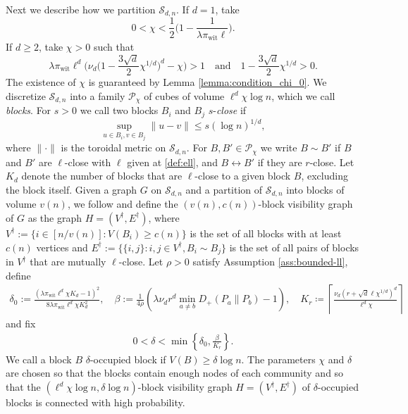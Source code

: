 \documentclass[11pt, a4paper]{amsart}
\newcommand{\1}{\mathbf{1}}
\newcommand{\visible}{\leftrightarrow{}}
\theoremstyle{definition}
\theoremstyle{remark}
\theoremstyle{definition}
\begin{document}
Next we describe how we partition $\mathcal S_{d, n}$. If $d=1$, take
\begin{equation}\label{eq:condition_chi_0_d1}
0<\chi < \frac{1}{2}\Big(1-\frac{1}{\lambda\pi_{\mathrm{wit}}\ell}\Big).
\end{equation}
If $d\geq 2$, take $\chi > 0$ such that    \begin{equation}\label{eq:condition_chi_0}
       \lambda \pi_{\mathrm{wit}} \ell^d \Big( \nu_d \Big(
            1-\frac{3\sqrt d}{2}\chi^{1/d}
            \Big)^d- \chi \Big) > 1
        \quad \text{and} \quad
            1 - \frac{3\sqrt d}{2}\chi^{1/d} > 0.
    \end{equation}
The existence of $\chi$ is guaranteed by Lemma \ref{lemma:condition_chi_0}. 
We discretize $\mathcal S_{d, n}$ into a family $\mathcal P_{\chi}$ of cubes of volume $\ell^d \chi \log n$, which we call \textit{blocks}. For $s>0$ we call two blocks 
$B_i$ and $B_j$ $s$-\textit{close} if 
    \begin{equation}
        \sup_{u\in B_i, v\in B_j} \|u - v\| \le s (\log n)^{1/d},
    \end{equation}
where  $\| \cdot \|$ is the toroidal metric on $\mathcal S_{d,n}$. For $B, B' \in \mathcal P_{\chi}$ we write $B \sim B'$ if $B$ and $B'$ are $\ell$-close with $\ell$ given at \eqref{def:ell}, and $B \visible B'$ if they are $r$-close. Let $K_d$ denote the number of blocks that are $\ell$-close to a given block $B$, excluding the block itself. Given a graph $G$ on $\mathcal S_{d,n}$ and a partition of $\mathcal S_{d,n}$ into blocks of volume $v(n)$, we follow \cite[Definition 5]{gaudio2026jan} and define the $(v(n),c(n))$-block visibility graph of $G$ as the graph $H=(V^\dagger, E^\dagger)$, where $V^\dagger := \{i \in [n/v(n)] : V(B_i) \geq c(n)\}$ is the set of all blocks with at least $c(n)$ vertices and $E^\dagger := \{\{i, j\}: i, j \in V^\dagger, B_i \sim B_j\}$ is the set of all pairs of blocks in $V^\dagger$ that are mutually $\ell$-close. Let $\rho>0$ satisfy Assumption \ref{ass:bounded-ll}, define
\begin{align}\label{eq:Kr}
\delta_0:=\frac{(\lambda \pi_{\mathrm{wit}}\ell^d \chi K_d-1)^2}{8 \lambda \pi_{\mathrm{wit}}\ell^d \chi K_d^2},\quad
\beta :=\frac{1}{4\rho}(\lambda \nu_d r^d \min_{a\neq b}D_+( P_a \|  P_b)-1),\quad  K_r \coloneqq  
    \left\lceil
    \frac{\nu_d(r+\sqrt d \ell\chi^{1/d})^d}{\ell^d\chi}
    \right\rceil 
\end{align}
  and fix \begin{align}\label{eq:condition_delta}
       0 < \delta < \min\left\{\delta_0, \frac{\beta}{K_r}\right\}
    .\end{align}
We call a block $B$ $\delta$-occupied block if $V(B) \ge \delta \log n$. The parameters $\chi$ and $\delta$ are chosen so that the blocks contain enough nodes of each community and so that the $(\ell^d \chi \log n, \delta \log n)$-block visibility graph $H=(V^\dagger, E^\dagger)$ of $\delta$-occupied blocks is connected with high probability. 
\end{document}
